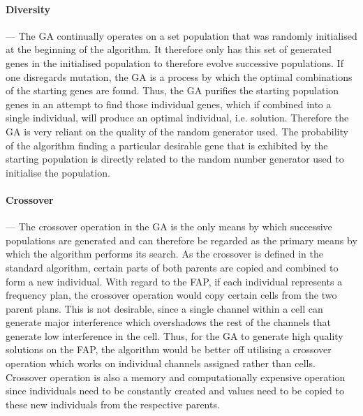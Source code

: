 \paragraph{Diversity}
--- The GA continually operates on a set population that was randomly initialised at the beginning of the algorithm. It therefore only has this set of generated genes in the initialised population to therefore evolve successive populations.
If one disregards mutation, the GA is a process by which the optimal combinations of the starting genes are found. Thus, the GA purifies the starting population genes in an attempt to find those individual genes, which if combined into a single individual, will produce an optimal individual, i.e. solution. Therefore the GA is very reliant on the quality of the random generator used. The probability of the algorithm finding a particular desirable gene that is exhibited by the starting population is directly related to the random number generator used to initialise the population. 
\paragraph{Crossover}
--- The crossover operation in the GA is the only means by which successive populations are generated and can therefore be regarded as the primary means by which the algorithm performs its search. As the crossover is defined in the standard algorithm, certain parts of both parents are copied and combined to form a new individual. With regard to the FAP, if each individual represents a frequency plan, the crossover operation would copy certain cells from the two parent plans. This is not desirable, since a single channel within a cell can generate major interference which overshadows the rest of the channels that generate low interference in the cell. Thus, for the GA to generate high quality solutions on the FAP, the algorithm would be better off utilising a crossover operation which works on individual channels assigned rather than cells. Crossover operation is also a memory and computationally expensive operation since individuals need to be constantly created and values need to be copied to these new individuals from the respective parents.
